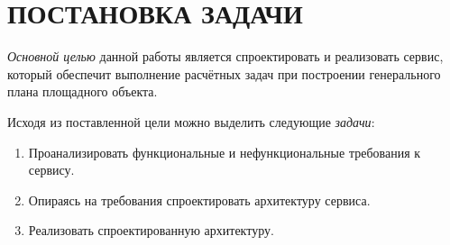 \section*{\Large{ПОСТАНОВКА ЗАДАЧИ}}

\textit{Основной целью} данной работы является спроектировать и реализовать сервис, который обеспечит
выполнение расчётных задач при построении генерального плана площадного объекта.

Исходя из поставленной цели можно выделить следующие \textit{задачи}:
\begin{enumerate}
    \item Проанализировать функциональные и нефункциональные требования к сервису.
    \item Опираясь на требования спроектировать архитектуру сервиса.
    \item Реализовать спроектированную архитектуру.
\end{enumerate}
